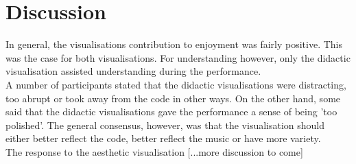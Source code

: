 \documentclass{article}
\begin{document}
\section{Discussion}

In general, the visualisations contribution to enjoyment was fairly positive. This was the case for both visualisations. For understanding however, only the didactic visualisation assisted understanding during the performance.\\

A number of participants stated that the didactic visualisations were distracting, too abrupt or took away from the code in other ways. On the other hand, some said that the didactic visualisations gave the performance a sense of being 'too polished'. The general consensus, however, was that the visualisation should either better reflect the code, better reflect the music or have more variety.\\

The response to the aesthetic visualisation [...more discussion to come]
\end{document}
